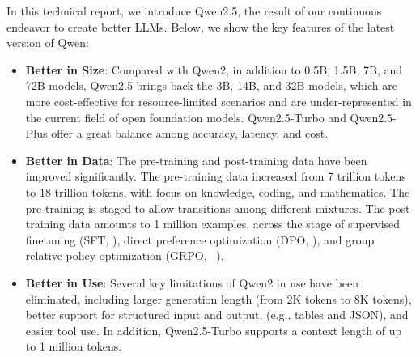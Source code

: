 In this technical report, we introduce Qwen2.5, the result of our continuous endeavor to create better LLMs. Below, we show the key features of the latest version of Qwen:

\begin{itemize}
    \item \textbf{Better in Size}: Compared with Qwen2, in addition to 0.5B, 1.5B, 7B, and 72B models, Qwen2.5 brings back the 3B, 14B, and 32B models, which are more cost-effective for resource-limited scenarios and are under-represented in the current field of open foundation models. Qwen2.5-Turbo and Qwen2.5-Plus offer a great balance among accuracy, latency, and cost.
    
    \item \textbf{Better in Data}: The pre-training and post-training data have been improved significantly.
    The pre-training data increased from 7 trillion tokens to 18 trillion tokens, with focus on knowledge, coding, and mathematics.
    The pre-training is staged to allow transitions among different mixtures.
    The post-training data amounts to 1 million examples, across the stage of supervised finetuning (SFT, \citealp{instructgpt}), direct preference optimization (DPO, \citealp{rafailov2024direct}), and group relative policy optimization (GRPO, ~\citealp{deepseekmath}).
    
    \item \textbf{Better in Use}: Several key limitations of Qwen2 in use have been eliminated, including larger generation length (from 2K tokens to 8K tokens), better support for structured input and output, (e.g., tables and JSON), and easier tool use. In addition, Qwen2.5-Turbo supports a context length of up to 1 million tokens.
\end{itemize}
